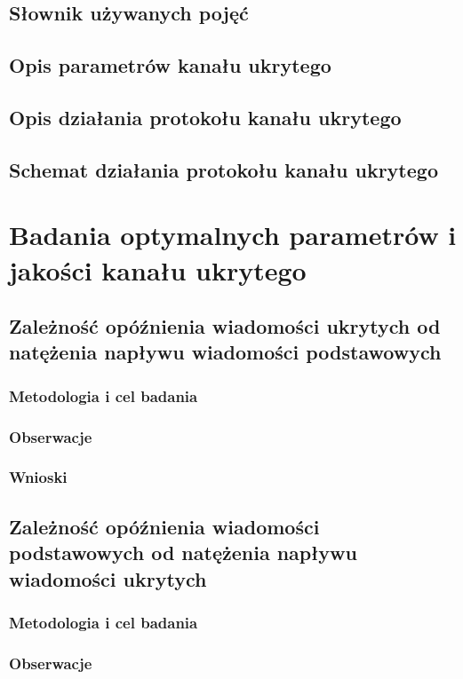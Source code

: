 \documentclass[a4paper]{report}
\begin{document}
    \section{Słownik używanych pojęć}
    \section{Opis parametrów kanału ukrytego}
    \section{Opis działania protokołu kanału ukrytego}
    \section{Schemat działania protokołu kanału ukrytego}

\chapter{Badania optymalnych parametrów i jakości kanału ukrytego}
    \section{Zależność opóźnienia wiadomości ukrytych od natężenia napływu wiadomości podstawowych}
        \subsection{Metodologia i cel badania}
        \subsection{Obserwacje}
        \subsection{Wnioski}

    \section{Zależność opóźnienia wiadomości podstawowych od natężenia napływu wiadomości ukrytych}
        \subsection{Metodologia i cel badania}
        \subsection{Obserwacje}
\end{document}
